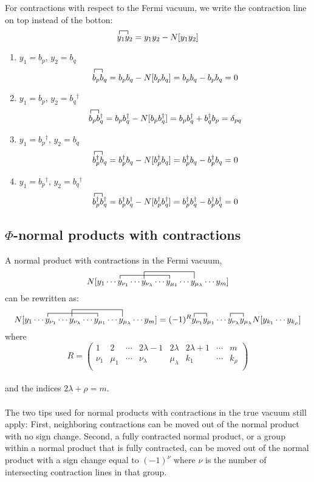 \documentclass{article}
\newcommand{\fctr}{\contraction}
\newcommand{\dg}{\ensuremath{^\dagger} }
\newcommand{\cd}{\ensuremath{\cdots} }
\begin{document}
For contractions with respect to the Fermi vacuum, we write the contraction line on top instead of the botton: 
$$
\fctr{}{y}{{}_1}{y}
y_1 y_2 = y_1y_2 - N[y_1y_2]
$$

\begin{enumerate}
\item $y_1 = b_p$, $y_2 = b_q$ \\
$$
\fctr{}{b}{{}_p}{b}
b_p b_q = b_p b_q  - N[b_p b_q] = b_p b_q  - b_p b_q  = 0 
$$
\item $y_1 = b_p$, $y_2 = b_q\dg$ \\
$$
\fctr{}{b}{{}_p}{b}
b_p b_q\dg = b_p b_q\dg  - N[b_p b_q\dg] = b_p b_q\dg  +  b_q\dg b_p = \delta_{pq}
$$
\item $y_1 = b_p\dg$, $y_2 = b_q$ \\
$$
\fctr{}{b}{{}_p}{b}
b_p\dg b_q = b_p\dg b_q  - N[b_p\dg b_q] = b_p\dg b_q  - b_p\dg b_q  = 0 
$$
\item $y_1 = b_p\dg$, $y_2 = b_q\dg$ \\
$$
\fctr{}{b}{{}_p}{b}
b_p\dg b_q\dg = b_p\dg b_q\dg  - N[b_p\dg b_q\dg] = b_p\dg b_q\dg  - b_p\dg b_q\dg  = 0 
$$
\end{enumerate}

\subsection{$\Phi$-normal products with contractions}
A normal product with contractions in the Fermi vacuum,
\[ 
\fctr{N[y_1 \cd }{x}{{}_{\nu_1} \cd y_{\nu_\lambda} \cd }{x}
\fctr[2ex]{N[y_1 \cd y_{\nu_1} \cd}{ x}{{}_{\nu_\lambda} \cd y_{\mu_1} \cd }{x} 
N[y_1 \cd y_{\nu_1} \cd y_{\nu_\lambda} \cd y_{\mu_1} \cd y_{\mu_\lambda} \cd y_m] 
\] 
can be rewritten as: 
\[ 
\fctr{N[y_1 \cd }{x}{{}_{\nu_1} \cd y_{\nu_\lambda} \cd }{x}
\fctr[2ex]{N[y_1 \cd y_{\nu_1} \cd}{ x}{{}_{\nu_\lambda} \cd y_{\mu_1} \cd }{x} 
N[y_1 \cd y_{\nu_1} \cd y_{\nu_\lambda} \cd y_{\mu_1} \cd y_{\mu_\lambda} \cd y_m] 
= 
\fctr{(-1)^R}{x}{{}_{\nu_1} }{x}
\fctr{(-1)^R y_{\nu_1}y_{\mu_1} \cd}{x}{{}_{\nu_\lambda} }{x}
(-1)^R y_{\nu_1}y_{\mu_1} \cd y_{\nu_\lambda} y_{\mu_\lambda} N[y_{k_1} \cd y_{k_\rho}]
\] 
where 
\[
R = 
\begin{pmatrix}
1 & 2 & \cd & 2\lambda -1 & 2\lambda & 2\lambda + 1&\cd & m  \\
\nu_1 & \mu_1 & \cd& \nu_\lambda & \mu_\lambda  &k_1 & \cd & k_\rho \\
\end{pmatrix}
\] \\
and the indices $2\lambda + \rho = m$.
\\ \\
The two tips used for normal products with contractions in the true vacuum still apply:
First, neighboring contractions can be moved out of the normal product with no sign change.
Second, a fully contracted normal product, or a group within a normal product that is fully contracted, 
can be moved out of the normal product with a sign change equal to $(-1)^\nu$ where $\nu$ is the number of intersecting contraction lines 
in that group. 
\end{document}
